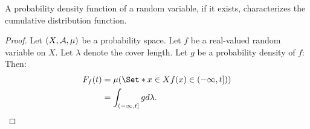\begin{prop}
A probability density
function of a random variable,
if it exists,
characterizes the cumulative
distribution function.

\begin{proof}
Let $(X, \mathcal{A}, \mu)$ be a
probability space.
Let $f$ be a real-valued
random variable on $X$.
Let $\lambda$ denote
the cover length.
Let $g$ be a probability
density of $f$:
Then:
\[
\begin{aligned}
    \rvcdf{f}(t)
    &= \mu(\Set*{x \in X}{f(x) \in (-\infty, t])}) \\
    &= \int_{(-\infty, t]} gd\lambda.
\end{aligned}
\]
\end{proof}

\end{prop}
\strats
